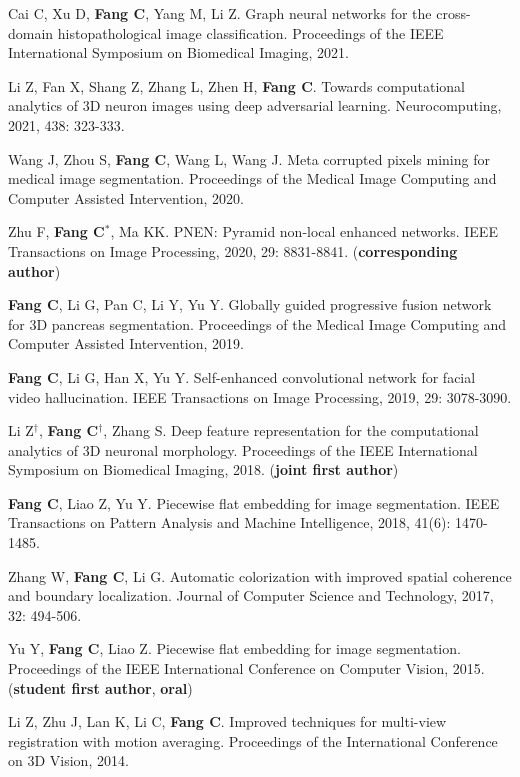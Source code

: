 \documentclass[a4paper,36pt]{article}
\newcommand{\tb}[1]{\textbf{#1}}
\newcommand{\resumeItemWithoutTitle}[1]{
  \item\justifying\small{
    {#1 \vspace{-2pt}}
  }
}
\begin{document}
\resumeItemWithoutTitle{Cai C, Xu D, \tb{Fang C}, Yang M, Li Z. Graph neural networks for the cross-domain histopathological image classification. Proceedings of the IEEE International Symposium on Biomedical Imaging, 2021.}

\resumeItemWithoutTitle{Li Z, Fan X, Shang Z, Zhang L, Zhen H, \tb{Fang C}. Towards computational analytics of 3D neuron images using deep adversarial learning. Neurocomputing, 2021, 438: 323-333.}

\resumeItemWithoutTitle{Wang J, Zhou S, \tb{Fang C}, Wang L, Wang J. Meta corrupted pixels mining for medical image segmentation. Proceedings of the Medical Image Computing and Computer Assisted Intervention, 2020.}



\resumeItemWithoutTitle{Zhu F, \tb{Fang C}$^\ast$, Ma KK. PNEN: Pyramid non-local enhanced networks. IEEE Transactions on Image Processing, 2020, 29: 8831-8841. (\tb{corresponding author})}


\resumeItemWithoutTitle{\tb{Fang C}, Li G, Pan C, Li Y, Yu Y. Globally guided progressive fusion network for 3D pancreas segmentation. Proceedings of the Medical Image Computing and Computer Assisted Intervention, 2019.}

\resumeItemWithoutTitle{\tb{Fang C}, Li G, Han X, Yu Y. Self-enhanced convolutional network for facial video hallucination. IEEE Transactions on Image Processing, 2019, 29: 3078-3090. }

\resumeItemWithoutTitle{Li Z$^\dag$, \tb{Fang C}$^\dag$, Zhang S. Deep feature representation for the computational analytics of 3D neuronal morphology. Proceedings of the IEEE International Symposium on Biomedical Imaging, 2018. (\tb{joint first author})}

\resumeItemWithoutTitle{\tb{Fang C}, Liao Z, Yu Y. Piecewise flat embedding for image segmentation. IEEE Transactions on Pattern Analysis and Machine Intelligence, 2018, 41(6): 1470-1485. }

\resumeItemWithoutTitle{Zhang W, \tb{Fang C}, Li G. Automatic colorization with improved spatial coherence and boundary localization. Journal of Computer Science and Technology, 2017, 32: 494-506.}

\resumeItemWithoutTitle{Yu Y, \tb{Fang C}, Liao Z. Piecewise flat embedding for image segmentation. Proceedings of the IEEE International Conference on Computer Vision, 2015. (\tb{student first author}, \tb{oral})}

\resumeItemWithoutTitle{Li Z, Zhu J, Lan K, Li C, \tb{Fang C}. Improved techniques for multi-view registration with motion averaging. Proceedings of the International Conference on 3D Vision, 2014.}
\end{document}
